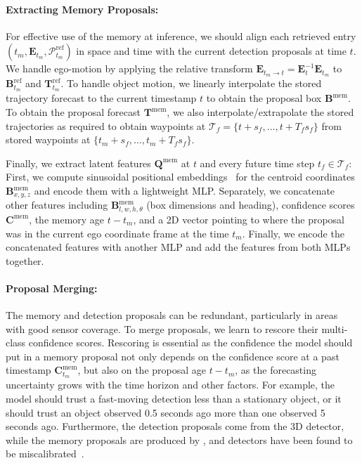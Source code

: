 \paragraph{Extracting Memory Proposals:}
For effective use of the memory at inference,
we should align each retrieved entry
$(t_m, \mathbf{E}_{t_m}, \mathcal{P}^{\mathrm{ref}}_{t_m})$
in space and time with the current detection proposals at time $t$.
We handle ego-motion by applying the relative transform
$\mathbf{E}_{t_m \to t} = \mathbf{E}_{t}^{-1} \mathbf{E}_{t_m}$
to $\mathbf{B}_{t_m}^{\mathrm{ref}}$ and $\mathbf{T}_{t_m}^{\mathrm{ref}}$.
To handle object motion, we linearly interpolate the stored trajectory forecast to the current timestamp $t$ to obtain the proposal box $\mathbf{B}^\mathrm{mem}$.
To obtain the proposal forecast $\mathbf{T}^\mathrm{mem}$,
we also interpolate/extrapolate the stored trajectories as required to obtain waypoints at $\mathcal{T}_f = \{t+s_f, \dots, t + T_f s_f\}$ from stored waypoints at $\{t_m+s_f, \dots, t_m + T_f s_f\}$.

Finally, we extract latent features $\mathbf{Q}^\mathrm{mem}$ at
$t$ and every future time step $t_f \in \mathcal{T}_f$:
First, we compute sinusoidal positional embeddings~\cite{vaswani2017attention}
for the centroid coordinates $\mathbf{B}^{\mathrm{mem}}_{x, y, z}$ and encode
them with a lightweight MLP.
Separately, we concatenate other features including
$\mathbf{B}^{\mathrm{mem}}_{l, w, h, \theta}$ (box dimensions and heading), confidence scores $\mathbf{C}^{\mathrm{mem}}$, the memory age $t - t_m$,
and a 2D vector pointing to where the proposal was in the current ego coordinate frame at the time $t_m$.
Finally, we encode the concatenated features with another MLP and add the features from both MLPs together.

\paragraph{Proposal Merging:} 
The memory and detection proposals can be redundant, particularly in areas with good sensor coverage. 
To merge proposals, we learn to rescore their multi-class confidence scores.
Rescoring is essential as the confidence the model should put in a memory proposal
not only depends on the confidence score at a past timestamp
$\mathbf{C}_{t_m}^\mathrm{mem}$, but also on the proposal age $t - t_m$, as the forecasting uncertainty grows with the time horizon and other factors.
For example, the model should trust a fast-moving detection less than a stationary object, or it should trust an object observed 0.5 seconds ago more than one observed 5 seconds ago.
Furthermore, the detection proposals come from the 3D detector, while the memory proposals are produced by \ourmodel{},
and detectors have been found to be miscalibrated~\cite{neumann2018relaxed,kuppers2020multivariate,minderer2021revisiting}.

